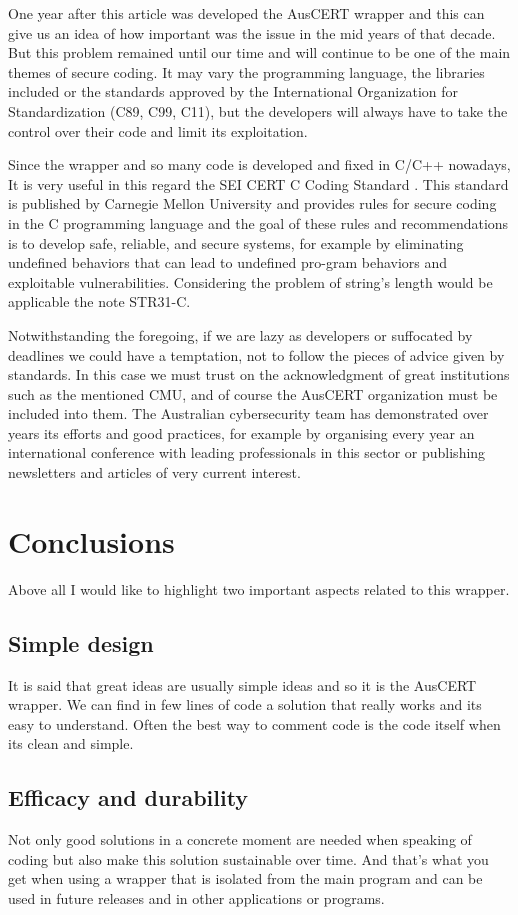 \documentclass[review]{IEEEtran}
\begin{document}
One year after this article was developed the AusCERT wrapper and this can give us an idea of how important was the issue in the mid years of that decade. But this problem remained until our time and will continue to be one of the main themes of secure coding. It may vary the programming language, the libraries included or the standards approved by the International Organization for Standardization (C89, C99, C11)\cite{b4}, but the developers will always have to take the control over their code and limit its exploitation.

Since the wrapper and so many code is developed and fixed in C/C++ nowadays, It is very useful in this regard the SEI CERT C Coding Standard \cite{b5}. This standard is published by Carnegie Mellon University and provides rules for secure coding in the C programming language and the goal of these rules and recommendations is to develop safe, reliable, and secure systems, for example by eliminating undefined behaviors that can lead to undefined pro-gram behaviors and exploitable vulnerabilities. Considering the problem of string’s length would be applicable the note STR31-C. 

Notwithstanding the foregoing, if we are lazy as developers or suffocated by deadlines we could have a temptation, not to follow the pieces of advice given by standards. In this case we must trust on the acknowledgment of great institutions such as the mentioned CMU, and of course the AusCERT organization must be included into them. The Australian cybersecurity team has demonstrated over years its efforts and good practices, for example by organising every year an international conference with leading professionals in this sector or publishing newsletters and articles of very current interest.

\section{Conclusions}

Above all I would like to highlight two important aspects related to this wrapper. 
\subsection{Simple design}
It is said that great ideas are usually simple ideas and so it is the AusCERT wrapper. We can find in few lines of code a solution that really works and its easy to understand. Often the best way to comment code is the code itself when its clean and simple.
\subsection{Efficacy and durability}
Not only good solutions in a concrete moment are needed when speaking of coding but also make this solution sustainable over time. And that's what you get when using a wrapper that is isolated from the main program and can be used in future releases and in other applications or programs.\\
\end{document}
